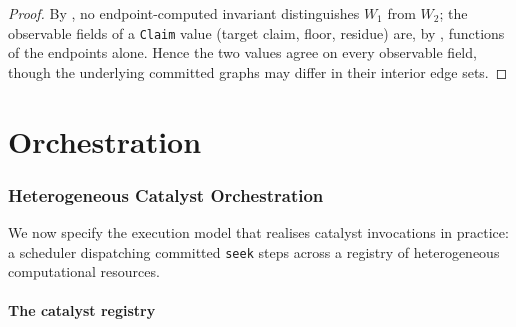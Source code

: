 \documentclass[11pt,twocolumn,a4paper]{article}
\theoremstyle{thmstyle}
\theoremstyle{definition}
\theoremstyle{remark}
\newcommand{\Walk}{W}
\begin{document}
\begin{proof}
By , no endpoint-computed invariant distinguishes
$\Walk_1$ from $\Walk_2$; the observable fields of a \texttt{Claim} value
(target claim, floor, residue) are, by ,
functions of the endpoints alone. Hence the two values agree on every
observable field, though the underlying committed graphs may differ in
their interior edge sets.
\end{proof}

\part{Orchestration}

\section{Heterogeneous Catalyst Orchestration}
\label{sec:orchestration}

We now specify the execution model that realises catalyst invocations in
practice: a scheduler dispatching committed \texttt{seek} steps across a
registry of heterogeneous computational resources.

\subsection{The catalyst registry}
\end{document}
